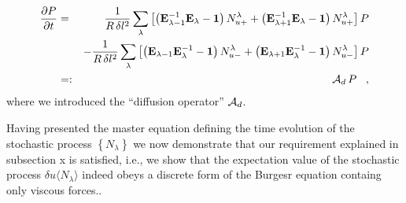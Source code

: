 \begin{eqnarray}
\label{DIFFOP}
\frac{\partial P}{\partial t} &=&  \frac{1}{R \, \delta l^2}
\sum_{\lambda} \left[ \left( {\bf{E}}_{\lambda -1}^{-1}
{\bf{E}}_{\lambda}
     - {\bf{1}} \right) N_{u+}^{\lambda}
     + \left( {\bf{E}}_{\lambda +1}^{-1} {\bf{E}}_{\lambda}
     - {\bf{1}} \right) N_{u+}^{\lambda} \right] P  \nonumber \\
 && - \frac{1}{R \, \delta l^2}
 \sum_{\lambda} \left[
      \left( {\bf{E}}_{\lambda -1} {\bf{E}}_{\lambda}^{-1}
     - {\bf{1}} \right)  N_{u-}^{\lambda} 
     + \left( {\bf{E}}_{\lambda +1} {\bf{E}}_{\lambda}^{-1}
     - {\bf{1}} \right) N_{u-}^{\lambda} \right] P  \nonumber \\
&=:&  {\cal{A}}_d \, P \;\;\; ,
\end{eqnarray}
where we introduced the ``diffusion operator'' ${\cal{A}}_d$.

Having presented the master equation defining the time evolution
of the stochastic process $\left\{ N_{\lambda} \right\}$ we now
demonstrate that
our requirement explained in subsection x is satisfied, i.e.,
we show that
the expectation value of the stochastic process
$\delta u \langle N_{\lambda} \rangle$ indeed
obeys a discrete form of the Burgesr equation containg only viscous forces.. 

